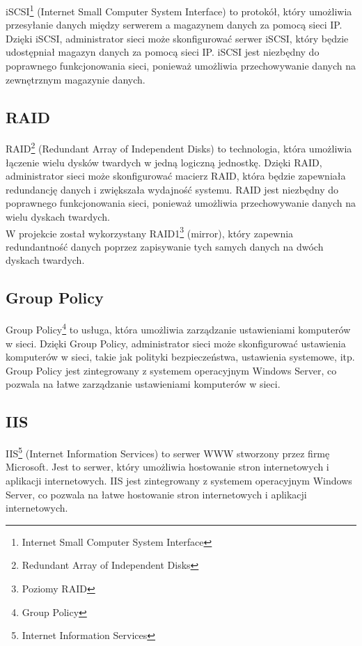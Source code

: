 iSCSI\footnote{Internet Small Computer System Interface\cite{ISCSIWiki}} (Internet Small Computer System Interface) to protokół, który umożliwia przesyłanie danych między serwerem a magazynem danych za pomocą sieci IP. Dzięki iSCSI, administrator sieci może skonfigurować serwer iSCSI, który będzie udostępniał magazyn danych za pomocą sieci IP. iSCSI jest niezbędny do poprawnego funkcjonowania sieci, ponieważ umożliwia przechowywanie danych na zewnętrznym magazynie danych.

\subsection{RAID}

RAID\footnote{Redundant Array of Independent Disks\cite{RAIDwiki}} (Redundant Array of Independent Disks) to technologia, która umożliwia łączenie wielu dysków twardych w jedną logiczną jednostkę. Dzięki RAID, administrator sieci może skonfigurować macierz RAID, która będzie zapewniała redundancję danych i zwiększała wydajność systemu. RAID jest niezbędny do poprawnego funkcjonowania sieci, ponieważ umożliwia przechowywanie danych na wielu dyskach twardych.\\
W projekcie został wykorzystany RAID1\footnote{Poziomy RAID\cite{RAIDLevelsWiki}} (mirror), który zapewnia redundantność danych poprzez zapisywanie tych samych danych na dwóch dyskach twardych.


\subsection{Group Policy}

Group Policy\footnote{Group Policy\cite{GroupPolicyWiki}} to usługa, która umożliwia zarządzanie ustawieniami komputerów w sieci. Dzięki Group Policy, administrator sieci może skonfigurować ustawienia komputerów w sieci, takie jak polityki bezpieczeństwa, ustawienia systemowe, itp. Group Policy jest zintegrowany z systemem operacyjnym Windows Server, co pozwala na łatwe zarządzanie ustawieniami komputerów w sieci.

\subsection{IIS}

IIS\footnote{Internet Information Services\cite{IISWiki}} (Internet Information Services) to serwer WWW stworzony przez firmę Microsoft. Jest to serwer, który umożliwia hostowanie stron internetowych i aplikacji internetowych. IIS jest zintegrowany z systemem operacyjnym Windows Server, co pozwala na łatwe hostowanie stron internetowych i aplikacji internetowych.

